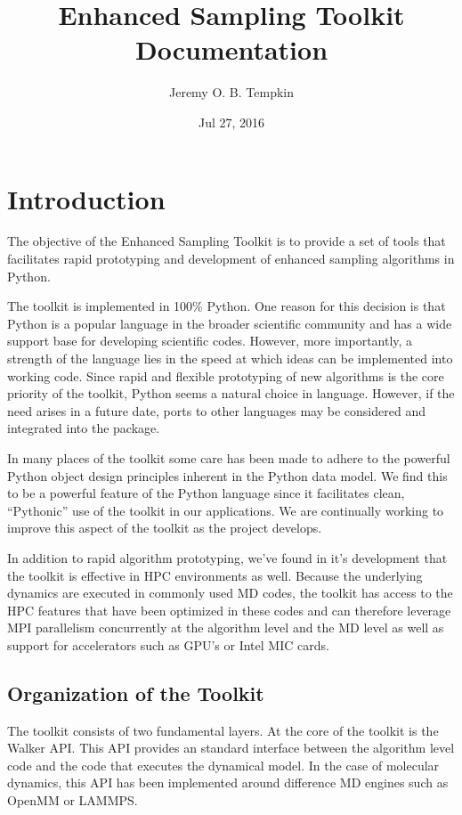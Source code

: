 \documentclass[letterpaper,10pt,english]{sphinxmanual}
\title{Enhanced Sampling Toolkit Documentation}
\date{Jul 27, 2016}
\author{Jeremy O. B. Tempkin}
\begin{document}
\maketitle
\tableofcontents
{}\label{index::doc}



\chapter{Introduction}
\label{introduction.doc:introduction}\label{introduction.doc:welcome-to-enhanced-sampling-toolkit-s-documentation}\label{introduction.doc::doc}
The objective of the Enhanced Sampling Toolkit is to provide a set of tools that facilitates rapid prototyping and development of enhanced sampling algorithms in Python.

The toolkit is implemented in 100\% Python. One reason for this decision is that Python is a popular language in the broader scientific community and has a wide support base for developing scientific codes. However, more importantly, a strength of the language lies in the speed at which ideas can be implemented into working code. Since rapid and flexible prototyping of new algorithms is the core priority of the toolkit, Python seems a natural choice in language. However, if the need arises in a future date, ports to other languages may be considered and integrated into the package.

In many places of the toolkit some care has been made to adhere to the powerful Python object design principles inherent in the Python data model. We find this to be a powerful feature of the Python language since it facilitates clean, ``Pythonic'' use of the toolkit in our applications. We are continually working to improve this aspect of the toolkit as the project develops.

In addition to rapid algorithm prototyping, we've found in it's development that the toolkit is effective in HPC environments as well. Because the underlying dynamics are executed in commonly used MD codes, the toolkit has access to the HPC features that have been optimized in these codes and can therefore leverage MPI parallelism concurrently at the algorithm level and the MD level as well as support for accelerators such as GPU's or Intel MIC cards.


\section{Organization of the Toolkit}
\label{introduction.doc:organization-of-the-toolkit}
The toolkit consists of two fundamental layers. At the core of the toolkit is the Walker API. This API provides an standard interface between the algorithm level code and the code that executes the dynamical model. In the case of molecular dynamics, this API has been implemented around difference MD engines such as OpenMM or LAMMPS.
\end{document}
